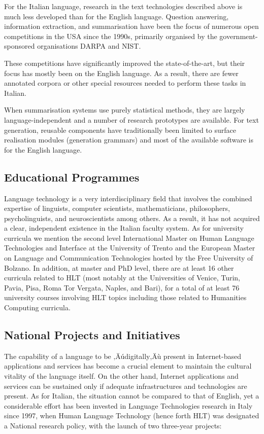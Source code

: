 \begin{multicols}{2}
For the Italian language, research in the text technologies described
above is much less developed than for the English language. Question
answering, information extraction, and summarisation have been the
focus of numerous open competitions in the USA since the 1990s,
primarily organised by the government-sponsored organisations DARPA
and NIST. 

These competitions have significantly improved the state-of-the-art,
but their focus has mostly been on the English language. As a result,
there are fewer annotated corpora or other special resources needed to
perform these tasks in Italian. 

When summarisation systems use purely statistical methods, they are largely language-independent and a number of research prototypes are available. For text generation, reusable components have traditionally been limited to surface realisation modules (generation grammars) and most of the available software is for the English language.


\subsection{Educational Programmes}

Language technology is a very interdisciplinary field that involves
the combined expertise of linguists, computer scientists,
mathematicians, philosophers, psycholinguists, and neuroscientists
among others. As a result, it has not acquired a clear, independent
existence in the Italian faculty system. As for university curricula we mention the second level International Master
on Human Language Technologies and Interface at the University of Trento and
the European Master on Language and Communication Technologies hosted by the
Free University of Bolzano. In addition, at master and PhD level, there are at least 16 other curricula related
to HLT (most notably at the Universities of Venice, Turin, Pavia, Pisa, Roma
Tor Vergata, Naples, and Bari), for a total of at least 76 university
courses involving HLT topics including those related to Humanities Computing curricula.

\subsection{National Projects and Initiatives}

The capability of a language to be ‚Äúdigitally‚Äù present in Internet-based applications and services has become a crucial element to maintain the cultural vitality of the language itself. On the other hand, Internet applications and services can be sustained only if adequate infrastructures and technologies are present. As for Italian, the situation cannot be compared to that of English, yet a considerable effort has been invested in Language Technologies research in Italy since 1997, when Human Language Technology (hence forth HLT) was designated a National research policy, with the launch of two three-year projects:


\end{multicols}
